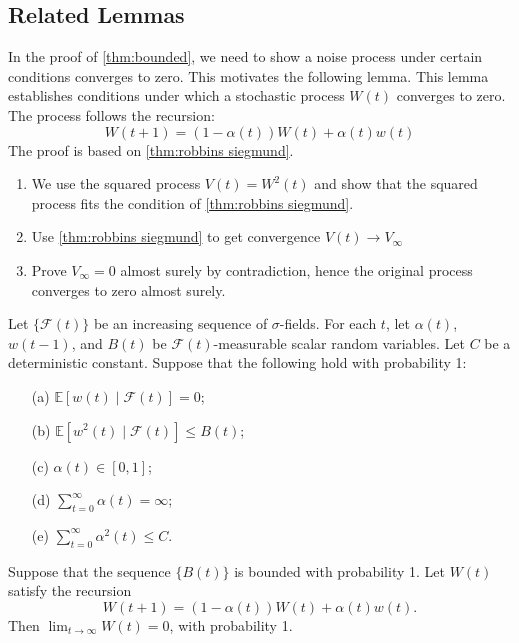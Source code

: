 \subsection{Related Lemmas}
In the proof of \autoref{thm:bounded}, we need to show a noise process under certain conditions converges to zero. This motivates the following lemma. This lemma establishes conditions under which a stochastic process $W(t)$ converges to zero. The process follows the recursion:
$$
W(t+1) = (1-\alpha(t))W(t)  +\alpha(t) w(t)
$$
The proof is based on \autoref{thm:robbins siegmund}.
\begin{enumerate}
    \item We use the squared process $V(t) =W^2(t)$ and show that the squared process fits the condition of \autoref{thm:robbins siegmund}.
    \item Use \autoref{thm:robbins siegmund} to get convergence $V(t) \to V_\infty$
    \item Prove $V_\infty=0$ almost surely by contradiction, hence the original process converges to zero almost surely.
\end{enumerate}
\begin{lemma}\label{lm:1}
Let $\{\mathcal{F}(t)\}$ be an increasing sequence of $\sigma$-fields. For each $t$, let $\alpha(t)$, $w(t-1)$, and $B(t)$ be $\mathcal{F}(t)$-measurable scalar random variables. Let $C$ be a deterministic constant. Suppose that the following hold with probability 1:
\begin{enumerate}
\item[(a)] $\mathbb{E}[w(t) \mid \mathcal{F}(t)] = 0$;
\item[(b)] $\mathbb{E}[w^2(t) \mid \mathcal{F}(t)] \leq B(t)$;
\item[(c)] $\alpha(t) \in [0,1]$;
\item[(d)] $\sum_{t=0}^{\infty} \alpha(t) = \infty$;
\item[(e)] $\sum_{t=0}^{\infty} \alpha^2(t) \leq C$.
\end{enumerate}
Suppose that the sequence $\{B(t)\}$ is bounded with probability 1. Let $W(t)$ satisfy the recursion
\begin{equation}
W(t+1) = (1 - \alpha(t))W(t) + \alpha(t)w(t).
\end{equation}
Then $\lim_{t \to \infty} W(t) = 0$, with probability 1.
\end{lemma}

